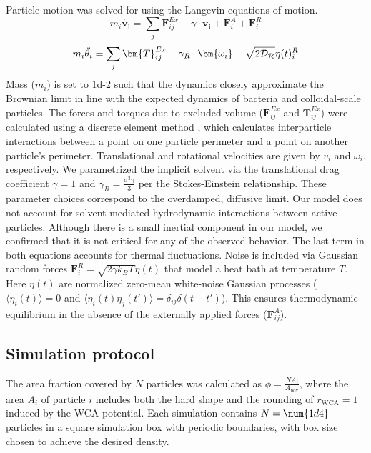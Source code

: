 Particle motion was solved for using the Langevin equations of motion.
\begin{equation}
m_i\dot{\bm{v_i}} = \sum_{j}\bm{F}^{Ex}_{ij} - \gamma\cdot\bm{v_i} + \bm{F}^A_i + \bm{F}^R_i
\end{equation}
\begin{equation}
m_i\Ddot{\theta_i} = \sum_{j}\bm{T}^{Ex}_{ij} - \gamma_R\cdot\bm{\omega_i} + \sqrt{2\mathcal{D_R}}\eta(t)_i^R
\end{equation}
Mass ($m_i$) is set to \num{1d-2} such that the dynamics closely approximate the Brownian limit in line with the expected dynamics of bacteria and colloidal-scale particles.
The forces and torques due to excluded volume ($\bm{F}^{Ex}_{ij}$ and $\bm{T}^{Ex}_{ij}$) were calculated using a discrete element method \cite{DEM_2017}, which calculates interparticle interactions between a point on one particle perimeter and a point on another particle's perimeter.
Translational and rotational velocities are given by $v_i$ and $\omega_i$, respectively.
We parametrized the implicit solvent via the translational drag coefficient $\gamma=1$ and $\gamma_R = \frac{\sigma^3\gamma}{3}$ per the Stokes-Einstein relationship.
These parameter choices correspond to the overdamped, diffusive limit.
Our model does not account for solvent-mediated hydrodynamic interactions between active particles.
Although there is a small inertial component in our model, we confirmed that it is not critical for any of the observed behavior.
The last term in both equations accounts for thermal fluctuations.
Noise is included via Gaussian random forces $\bm{F}^R_i = \sqrt{2\gamma k_BT}\eta(t)$ that model a heat bath at temperature $T$.
Here $\eta(t)$ are normalized zero-mean white-noise Gaussian processes ($ \langle \eta_i(t) \rangle = 0 $ and $ \langle \eta_i(t)\eta_j(t') \rangle = \delta_{ij}\delta(t-t') $).
This ensures thermodynamic equilibrium in the absence of the externally applied forces ($\bm{F}^{A}_{ij}$).


\subsection{Simulation protocol}

The area fraction covered by $N$ particles was calculated as $\phi=\frac{NA_i}{A_\text{box}}$, where the area $A_i$ of particle $i$ includes both the hard shape and the rounding of $r_\text{WCA}=1$ induced by the WCA potential.
Each simulation contains $N=\num{1d4}$ particles in a square simulation box with periodic boundaries, with box size chosen to achieve the desired density.

